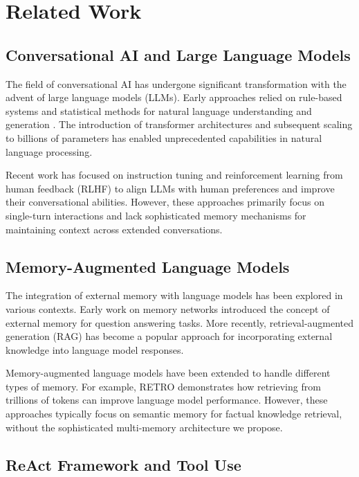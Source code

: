 \documentclass[11pt]{article}
\begin{document}
\section{Related Work}

\subsection{Conversational AI and Large Language Models}

The field of conversational AI has undergone significant transformation with the advent of large language models (LLMs). Early approaches relied on rule-based systems and statistical methods for natural language understanding and generation \cite{jurafsky2020speech}. The introduction of transformer architectures \cite{vaswani2017attention} and subsequent scaling to billions of parameters \cite{brown2020language,chowdhery2022palm} has enabled unprecedented capabilities in natural language processing.

Recent work has focused on instruction tuning \cite{wei2021finetuned} and reinforcement learning from human feedback (RLHF) \cite{ouyang2022training} to align LLMs with human preferences and improve their conversational abilities. However, these approaches primarily focus on single-turn interactions and lack sophisticated memory mechanisms for maintaining context across extended conversations.

\subsection{Memory-Augmented Language Models}

The integration of external memory with language models has been explored in various contexts. Early work on memory networks \cite{weston2014memory} introduced the concept of external memory for question answering tasks. More recently, retrieval-augmented generation (RAG) \cite{lewis2020rag} has become a popular approach for incorporating external knowledge into language model responses.

Memory-augmented language models have been extended to handle different types of memory. For example, RETRO \cite{borgeaud2022retro} demonstrates how retrieving from trillions of tokens can improve language model performance. However, these approaches typically focus on semantic memory for factual knowledge retrieval, without the sophisticated multi-memory architecture we propose.

\subsection{ReAct Framework and Tool Use}
\end{document}
